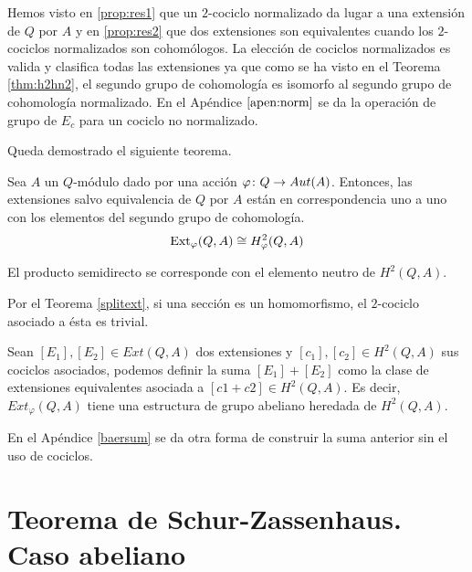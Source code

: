 Hemos visto en \ref{prop:res1} que un $2$-cociclo normalizado da lugar a una extensión de $Q$ por $A$ y en \ref{prop:res2} que dos extensiones son equivalentes cuando los $2$-cociclos normalizados son cohomólogos. La elección de cociclos normalizados es valida y clasifica todas las extensiones ya que como se ha visto en el Teorema \ref{thm:h2hn2}, el segundo grupo de cohomología es isomorfo al segundo grupo de cohomología normalizado. En el Apéndice $\ref{apen:norm}$ se da la operación de grupo de $E_c$ para un cociclo no normalizado.

Queda demostrado el siguiente teorema. %

\begin{teorema}\label{h2}
	Sea $A$ un $Q$-módulo dado por una acción $\varphi\colon Q\to Aut(A)$. Entonces, las extensiones salvo equivalencia de $Q$ por $A$ están en correspondencia uno a uno con los elementos del segundo grupo de cohomología.
	\begin{equation*}
		\operatorname{Ext}_{\varphi}(Q,A)\cong H^2_{\varphi}(Q,A)
	\end{equation*}
\end{teorema}

\begin{observacion}\label{obs:split}
	El producto semidirecto se corresponde con el elemento neutro de $H^2(Q,A)$.
	\begin{demostracion}
		Por el Teorema \ref{splitext}, si una sección es un homomorfismo, el $2$-cociclo asociado a ésta es trivial.
	\end{demostracion}
\end{observacion}

\begin{proposicion}\label{extsum}
	Sean $[E_1],[E_2]\in Ext(Q,A)$ dos extensiones y $[c_1],[c_2]\in H^2(Q,A)$ sus cociclos asociados, podemos definir la suma $[E_1] + [E_2]$ como la clase de extensiones equivalentes asociada a $[c1+c2]\in H^2(Q,A)$. Es decir, $Ext_\varphi(Q,A)$ tiene una estructura de grupo abeliano heredada de $H^2(Q,A)$.
\end{proposicion}

En el Apéndice \ref{baersum} se da otra forma de construir la suma anterior sin el uso de cociclos.

\section{Teorema de Schur-Zassenhaus. Caso abeliano}

